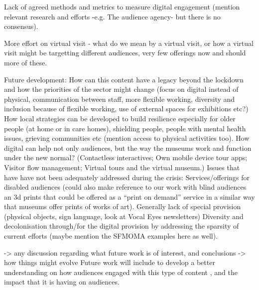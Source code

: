 \documentclass{egpubl}
\begin{document}
Lack of agreed methods and metrics to measure digital engagement (mention relevant research and efforts -e.g. The audience agency- but there is no consensus).

More effort on virtual visit - what do we mean by a virtual visit, or how a virtual visit might be targetting different audiences, very few offerings now and should more of these.


Future development:
How can this content have a legacy beyond the lockdown and how the priorities of the sector might change (focus on digital instead of physical, communication between staff, more flexible working, diversity and inclusion because of flexible working, use of external spaces for exhibitions etc?)
How local strategies can be developed to build resilience especially for older people (at home or in care homes), shielding people, people with mental health issues, grieving communities etc (mention access to physical activities too). 
How digital can help not only audiences, but the way the museums work and function under the new normal? (Contactless interactives; Own mobile device tour apps; Visitor flow management; Virtual tours and the virtual museum.)
Issues that have have not been adequately addressed during the crisis:
Services/offerings for disabled audiences (could also make reference to our work with blind audiences an 3d prints that could be offered as a “print on demand” service in a similar way that museums offer prints of works of art). Generally lack of special provision (physical objects, sign language, look at Vocal Eyes newsletters)
Diversity and decolonisation through/for the digital provision by addressing the sparsity of current efforts (maybe mention the SFMOMA examples here as well).

-> any discussion regarding what future work is of interest, and conclusions
->  how things might evolve
Future work will include to develop a better  understanding on how audiences engaged with this type of content  , and the impact that it is having on audiences. 







  
        


\end{document}
